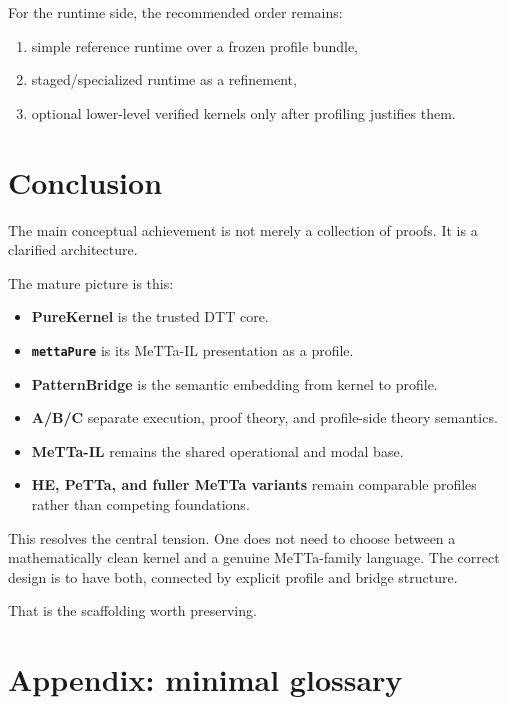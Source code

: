 \documentclass[11pt]{article}
\begin{document}
For the runtime side, the recommended order remains:

\begin{enumerate}
  \item simple reference runtime over a frozen profile bundle,
  \item staged/specialized runtime as a refinement,
  \item optional lower-level verified kernels only after profiling justifies them.
\end{enumerate}

\section{Conclusion}

The main conceptual achievement is not merely a collection of proofs. It is a clarified architecture.

The mature picture is this:

\begin{itemize}
  \item \textbf{PureKernel} is the trusted DTT core.
  \item \textbf{\texttt{mettaPure}} is its MeTTa-IL presentation as a profile.
  \item \textbf{PatternBridge} is the semantic embedding from kernel to profile.
  \item \textbf{A/B/C} separate execution, proof theory, and profile-side theory semantics.
  \item \textbf{MeTTa-IL} remains the shared operational and modal base.
  \item \textbf{HE, PeTTa, and fuller MeTTa variants} remain comparable profiles rather than competing foundations.
\end{itemize}

This resolves the central tension. One does not need to choose between a mathematically clean kernel and a genuine MeTTa-family language. The correct design is to have both, connected by explicit profile and bridge structure.

That is the scaffolding worth preserving.

\section*{Appendix: minimal glossary}
\end{document}

